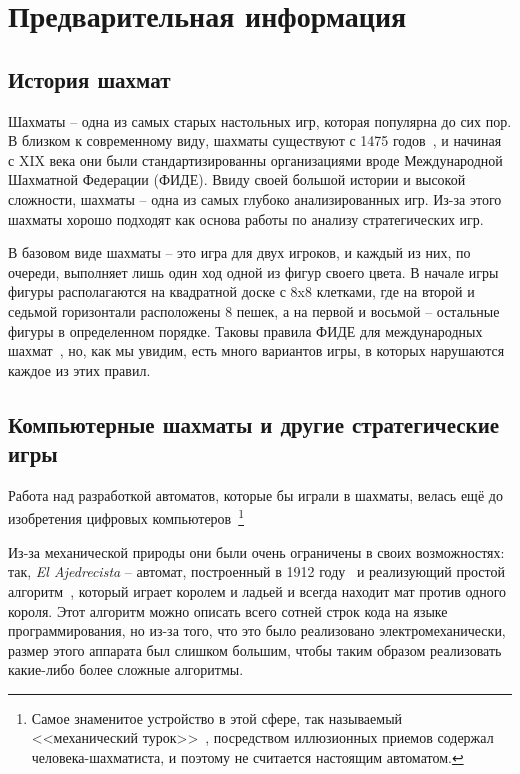 \documentclass{article}
\begin{document}
\newpage

\section{Предварительная информация}

\subsection{История шахмат}

Шахматы -- одна из самых старых настольных игр, которая популярна до сих пор.
В близком к современному виду, шахматы существуют с 1475 годов~\cite{world_of_chess},
и начиная с XIX века они были стандартизированны организациями вроде Международной
Шахматной Федерации (ФИДЕ). Ввиду своей большой истории и высокой сложности, шахматы -- 
одна из самых глубоко анализированных игр. Из-за этого шахматы хорошо подходят 
как основа работы по анализу стратегических игр.

В базовом виде шахматы -- это игра для двух игроков,
и каждый из них, по очереди, выполняет лишь один ход одной из фигур своего цвета. 
В начале игры фигуры располагаются на квадратной доске с 8x8 клетками,
где на второй и седьмой горизонтали расположены 8 пешек,
а на первой и восьмой -- остальные фигуры в определенном порядке.
Таковы правила ФИДЕ для международных шахмат~\cite{fide-laws},
но, как мы увидим, есть много вариантов игры,
в которых нарушаются каждое из этих правил.

\subsection{Компьютерные шахматы и другие стратегические игры}

Работа над разработкой автоматов, которые бы играли в шахматы,
велась ещё до изобретения цифровых компьютеров~\footnote{
    Самое знаменитое устройство в этой сфере, так называемый <<механический турок>>~\cite{mechturk},
посредством иллюзионных приемов содержал человека-шахматиста,
и поэтому не считается настоящим автоматом.}

Из-за механической природы они были очень ограничены в своих возможностях:
так, \emph{El Ajedrecista} -- автомат, построенный в 1912 году~\cite{ajedrecista-article}
и реализующий простой алгоритм~\cite{ajedrecista-algo}, который играет королем и ладьей
и всегда находит мат против одного короля.
Этот алгоритм можно описать всего сотней строк кода на языке программирования,
но из-за того, что это было реализовано электромеханически,
размер этого аппарата был слишком большим,
чтобы таким образом реализовать какие-либо более сложные алгоритмы.
\end{document}
